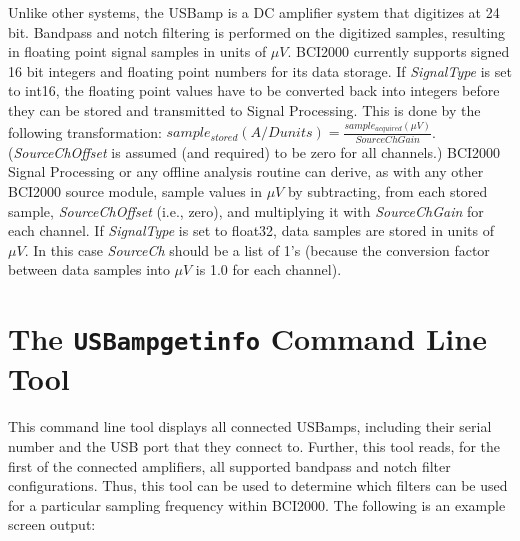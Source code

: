 \documentclass[letterpaper, oneside, 12pt]{article}
\begin{document}
Unlike other systems, the USBamp is a DC amplifier system that digitizes at 24 
bit. Bandpass and notch filtering is performed on the digitized samples, 
resulting in floating point signal samples in units of $\mu V$. BCI2000 
currently supports signed 16 bit integers and floating point numbers for its data storage.
If \emph{SignalType} is set to int16, the floating point values have 
to be converted back into integers before they can be stored and transmitted to 
Signal Processing. This is done by the following transformation: 
$sample_{stored}(A/D units)=\frac{sample_{acquired}(\mu V)}{SourceChGain}$. 
(\emph{SourceChOffset} is assumed (and required) to be zero for all channels.) 
BCI2000 Signal Processing or any offline analysis routine can derive, as with 
any other BCI2000 source module, sample values in $\mu V$ by subtracting, from 
each stored sample, \emph{SourceChOffset} (i.e., zero), and multiplying it with 
\emph{SourceChGain} for each channel. If \emph{SignalType} is set to float32,
data samples are stored in units of $\mu V$. In this case \emph{SourceCh} should be
a list of 1's (because the conversion factor between data samples into $\mu V$ is
1.0 for each channel).

\section{The \texttt{USBampgetinfo} Command Line Tool}

This command line tool displays all connected USBamps, including their serial 
number and the USB port that they connect to. Further, this tool reads, for the 
first of the connected amplifiers, all supported bandpass and notch filter 
configurations. Thus, this tool can be used to determine which filters can be 
used for a particular sampling frequency within BCI2000. The following is an 
example screen output:
\end{document}
